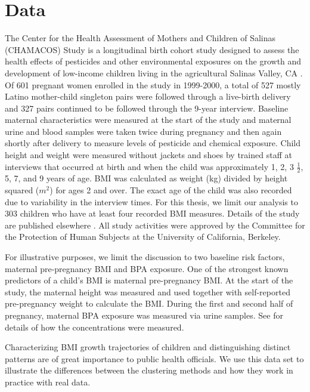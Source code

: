 \section{Data}
The Center for the Health Assessment of Mothers and Children of Salinas (CHAMACOS) Study is a longitudinal birth cohort study designed to assess the health effects of pesticides and other environmental exposures on the growth and development of low-income children living in the agricultural Salinas Valley, CA \cite{eskenazi2004,eskenazi2005}. Of 601 pregnant women enrolled in the study in 1999-2000, a total of 527 mostly Latino mother-child singleton pairs were followed through a live-birth delivery and 327 pairs continued to be followed through the 9-year interview. Baseline maternal characteristics were measured at the start of the study and maternal urine and blood samples were taken twice during pregnancy and then again shortly after delivery to measure levels of pesticide and chemical exposure. Child height and weight were measured without jackets and shoes by trained staff at interviews that occurred at birth and when the child was approximately 1, 2, 3 $\frac{1}{2}$, 5, 7, and 9 years of age. BMI was calculated as weight (kg) divided by height squared ($m^{2}$) for ages 2 and over. The exact age of the child was also recorded due to variability in the interview times. For this thesis, we limit our analysis to 303 children who have at least four recorded BMI measures. Details of the study are published elsewhere \cite{eskenazi2003}. All study activities were approved by the Committee for the Protection of Human Subjects at the University of California, Berkeley. 

For illustrative purposes, we limit the discussion to two baseline risk factors, maternal pre-pregnancy BMI and BPA exposure. One of the strongest known predictors of a child's BMI is maternal pre-pregnancy BMI. At the start of the study, the maternal height was measured and used together with self-reported pre-pregnancy weight to calculate the BMI. During the first and second half of pregnancy, maternal BPA exposure was measured via urine samples. See \textcite{harley2013} for details of how the concentrations were measured.

Characterizing BMI growth trajectories of children and distinguishing distinct patterns are of great importance to public health officials. We use this data set to illustrate the differences between the clustering methods and how they work in practice with real data.

